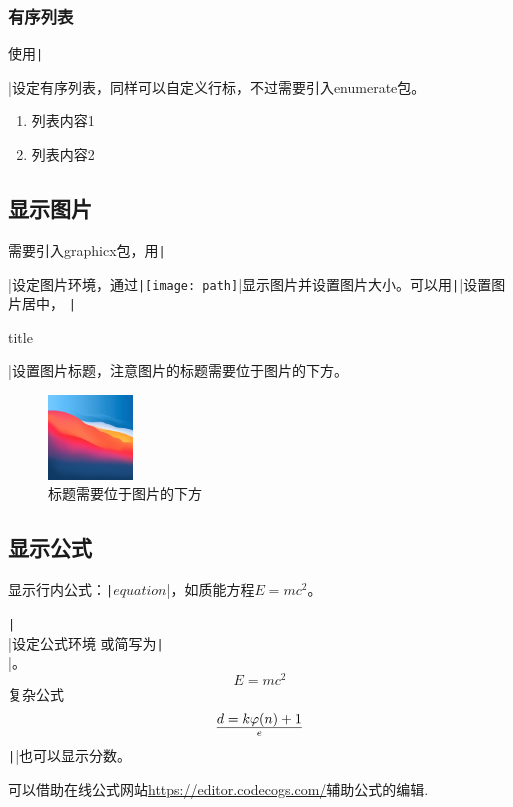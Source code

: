 \documentclass[fontset=ubuntu]{ctexart}
\begin{document}
\subsubsection{有序列表}
使用\texttt|\begin{enumerate} \end{enumerate}|设定有序列表，同样可以自定义行标，不过需要引入enumerate包。
\begin{enumerate}[1)]
    \item 列表内容1
    \item 列表内容2
\end{enumerate}

\subsection{显示图片}
需要引入graphicx包，用\texttt|\begin{figure} \end{figure}|设定图片环境，通过\texttt|\texttt{[image: path]}|显示图片并设置图片大小。可以用\texttt|\centering|设置图片居中，
\texttt|\caption{title}|设置图片标题，注意图片的标题需要位于图片的下方。

\begin{figure}[htb]
\centering
\includegraphics[width=0.2\textwidth]{Big Sur.jpg}
\caption{标题需要位于图片的下方}
\end{figure}

\subsection{显示公式}
显示行内公式：\texttt|$equation$|，如质能方程$E = mc^2$。

\texttt|\begin{equation} \end{equation}|设定公式环境
或简写为\texttt|\[ \]|。
\[
E = mc^2
\]
复杂公式
\[
d = {k \varphi(n) + 1} \over e
\]
\texttt|\frac{}{}|也可以显示分数。

可以借助在线公式网站\url{https://editor.codecogs.com/}辅助公式的编辑.
\end{document}
